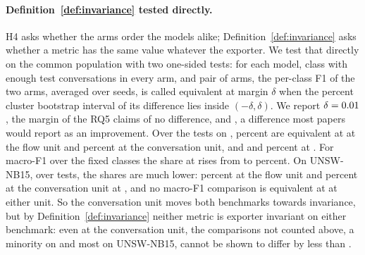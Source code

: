 

\paragraph{Definition~\ref{def:invariance} tested directly.} H4 asks whether the arms order the models alike; Definition~\ref{def:invariance} asks whether a metric has the same value whatever the exporter. We test that directly on the common population with two one-sided tests: for each model, class with enough test conversations in every arm, and pair of arms, the per-class F1 of the two arms, averaged over seeds, is called equivalent at margin $\delta$ when the  percent cluster bootstrap interval of its difference lies inside $(-\delta, \delta)$. We report $\delta = 0.01$, the margin of the RQ5 claims of no difference,  and , a difference most papers would report as an improvement. Over the \RevEqTestsCic{} tests on \cicids{}, \RevEqCicFlowTwo{} percent are equivalent at  at the flow unit and \RevEqCicConvTwo{} percent at the conversation unit, and \RevEqCicFlowFive{} and \RevEqCicConvFive{} percent at . For macro-F1 over the fixed classes the share at  rises from \RevEqMacCicFlowFive{} to \RevEqMacCicConvFive{} percent. On UNSW-NB15, over \RevEqTestsUnsw{} tests, the shares are much lower: \RevEqUnswFlowFive{} percent at the flow unit and \RevEqUnswConvFive{} percent at the conversation unit at , and no macro-F1 comparison is equivalent at  at either unit. So the conversation unit moves both benchmarks towards invariance, but by Definition~\ref{def:invariance} neither metric is exporter invariant on either benchmark: even at the conversation unit, the comparisons not counted above, a minority on \cicids{} and most on UNSW-NB15, cannot be shown to differ by less than .

